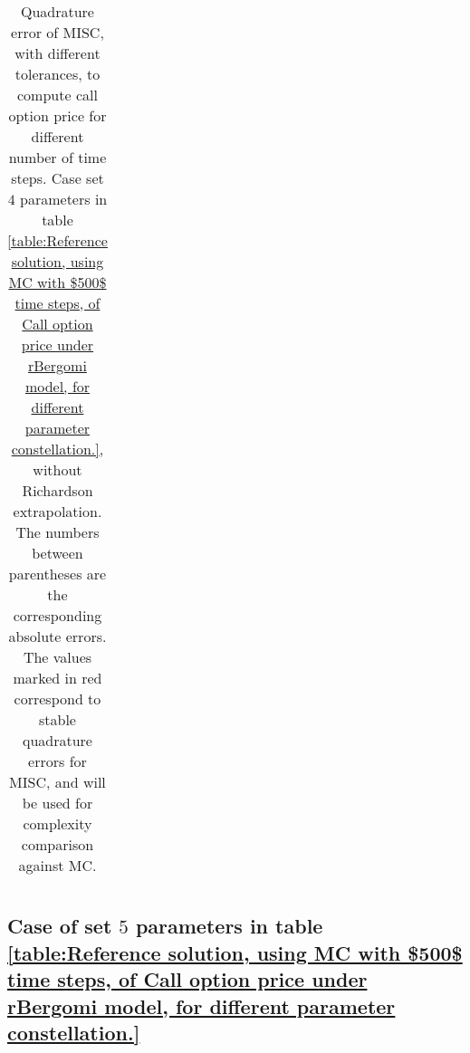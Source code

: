 \begin{table}[h!]
\begin{tabular}{l*{6}{c}r}
		\hline
		
	\end{tabular}
	\caption{Quadrature error of MISC, with different tolerances,  to compute call option price for different number of time steps. Case  set $4$ parameters in table \ref{table:Reference solution, using MC with $500$ time steps, of Call option price under rBergomi model, for different parameter constellation.}, without Richardson extrapolation. The numbers between parentheses are the corresponding absolute errors. The values marked in red correspond to stable quadrature errors for MISC, and will be used for complexity comparison against MC.}
	\label{Quadrature error of MISC to compute Call option price of the different tolerances for different number of time steps. Case  set $4$ parameters, without Richardson extrapolation. The numbers between parentheses are the corresponding absolute errors.}
\end{table}



\FloatBarrier
\subsection{Case of set $5$ parameters in table \ref{table:Reference solution, using MC with $500$ time steps, of Call option price under rBergomi model, for different parameter constellation.}}\label{appendix:Case of set 5 parameters}


